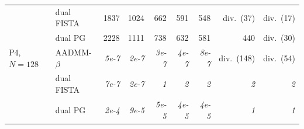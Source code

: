 \begin{table}[htbp]
\begin{tabular}{llrrrrrrr}
 & dual FISTA & 1837 & 1024 & 662 & 591 & 548 & div.\ (37) & div.\ (17) \\
 & dual PG & 2228 & 1111 & 738 & 632 & 581 & 440 & div.\ (30) \\
\addlinespace[2pt]
P4, $N{=}128$ & AADMM-$\beta$ & \textit{5e-7} & \textit{2e-7} & \textit{3e-7} & \textit{4e-7} & \textit{8e-7} & div.\ (148) & div.\ (54) \\
 & dual FISTA & \textit{7e-7} & \textit{2e-7} & \textit{1} & \textit{2} & \textit{2} & \textit{2} & \textit{2} \\
 & dual PG & \textit{2e-4} & \textit{9e-5} & \textit{5e-5} & \textit{4e-5} & \textit{4e-5} & \textit{1} & \textit{1} \\
\bottomrule
\end{tabular}
\end{table}
